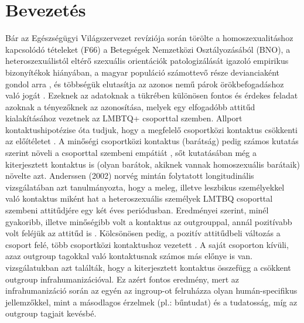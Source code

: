 \section{Bevezetés}
Bár az Egészségügyi Világszervezet revíziója során törölte a homoszexualitáshoz kapcsolódó tételeket (F66) a Betegségek Nemzetközi Osztályozásából (BNO), a heteroszexuálistól eltérő szexuális orientációk patologizálását igazoló empirikus bizonyítékok hi\-ányában, a magyar populáció számottevő része devianciaként gondol arra \parencite{judit_2011}, és többségük elutasítja az azonos nemű párok örökbefogadáshoz való jogát \parencite{judit_2011}. Ezeknek az adatoknak a tükrében különösen fontos és érdekes  feladat azoknak a tényezők\-nek az azonosítása, melyek egy elfogadóbb attitűd kialakításához vezetnek az LMBTQ+ csoporttal szemben. Allport kontaktushipotézise óta tudjuk, hogy a megfelelő csoportközi kontaktus csökkenti az előítéletet \parencite{christie_allport_1954}. A minőségi csoportközi kontaktus (barátság) pedig számos kutatás szerint növeli a csoporttal szembeni empátiát  \parencite{abbott_cameron_2014,pettigrew_1997}, sőt \textcite{antonio_guerra_moleiro_2017} kutatásában még a kiterjesztett kontaktus is (olyan barátok, akiknek vannak homoszexuális barátaik) növelte azt. 
Anderssen (2002) norvég mintán folytatott longitudinális vizsgálatában azt tanulmányozta, hogy a meleg, illetve leszbikus személyekkel való kontaktus miként hat a heteroszexuális személyek LMTBQ csoporttal szembeni attitűdjére egy két éves periódusban. Eredményei szerint, minél gyakoribb, illetve minőségibb volt a kontaktus az outgrouppal, annál pozitívabb volt feléjük az attitűd is \parencite{anderssen_2002}. Kölcsönösen pedig, a pozitív attitűdbeli változás a csoport felé, több csoportközi kontaktushoz vezetett \parencite{anderssen_2002}. A saját csoporton kívüli, azaz outgroup tagokkal való kontaktusnak számos más előnye is van. \parencite{capozza_falvo_trifiletti_pagani_2014} vizsgálatukban azt találták, hogy a kiterjesztett kontaktus összefügg a csökkent outgroup infrahumanizációval. Ez azért fontos eredmény, mert az infrahumanizáció során az egyén az ingroup-ot felruházza olyan humán-specifikus jellemzőkkel, mint a másodlagos érzelmek (pl.: bűntudat) és a tudatosság, míg az outgroup tagjait kevésbé.
\\ \par
